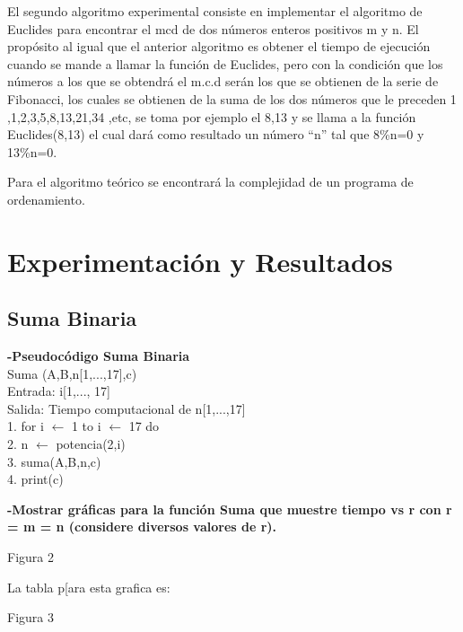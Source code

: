 \documentclass[spanish]{article}
\begin{document}
El segundo algoritmo experimental  consiste en  implementar el algoritmo de Euclides para encontrar el mcd de dos números enteros positivos m y n. 
El propósito al igual que el anterior algoritmo es obtener el tiempo de ejecución cuando se mande a llamar la función de Euclides, 
pero con la condición que los números a los que se obtendrá el m.c.d serán los que se obtienen de la serie de Fibonacci, 
los cuales se obtienen de la suma de los dos números que le preceden 
1 ,1,2,3,5,8,13,21,34 ,etc, se toma por ejemplo el 8,13 y se llama a la función Euclides(8,13) el cual dará como resultado un número “n” tal que 8\%n=0 y 13\%n=0.

Para el algoritmo teórico se encontrará la complejidad de un programa de ordenamiento.
	
\newpage	
\section{Experimentaci\'on y Resultados}
	\subsection{Suma Binaria}
	{\large{\bf-Pseudoc\'odigo Suma Binaria}}\\
	Suma (A,B,n[1,...,17],c)\\
Entrada: i[1,..., 17]\\
Salida: Tiempo computacional de n[1,...,17]\\
1. for i $\leftarrow$ 1 to i $\leftarrow$ 17 do\\
2.		\hspace{0.7cm}n $\leftarrow$ potencia(2,i)\\
3.      \hspace{0.7cm}suma(A,B,n,c)\\
4. 		\hspace{0.7cm}print(c)
\bigskip

	{\large{\bf-Mostrar gráficas para la función Suma que muestre tiempo vs r con r = m = n (considere diversos valores de r).}}\\
	\begin{center}
		Figura 2\\
	\end{center}
	
	La tabla p[ara esta grafica es:\\
	\begin{center}
		Figura 3\\
	\end{center}
\end{document}
